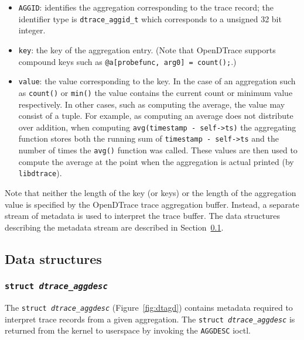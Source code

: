 \begin{itemize}

	\item{\texttt{AGGID}}: identifies the aggregation corresponding to the
trace record; the identifier type is \texttt{dtrace\_aggid\_t} which corresponds
to a unsigned 32 bit integer.

	\item{\texttt{key}:} the key of the aggregation entry. (Note that
OpenDTrace supports compound keys such as \texttt{@a[probefunc, arg0] = count();}.)

	\item{\texttt{value}:} the value corresponding to the key. In the case of
an aggregation such as \texttt{count()} or \texttt{min()} the value contains
the current count or minimum value respectively. In other cases, such as
computing the average, the value may consist of a tuple. For example, as
computing an average does not distribute over addition, when computing
\texttt{avg(timestamp - self->ts)} the aggregating function stores both the
running sum of \texttt{timestamp - self->ts} and the number of times the
\texttt{avg()} function was called. These values are then used to compute the
average at the point when the aggregation is actual printed (by \texttt{libdtrace}).

\end{itemize}

Note that neither the length of the key (or keys) or the length of the aggregation 
value is specified by the OpenDTrace trace aggregation buffer.
Instead, a separate stream of metadata is used to interpret the trace buffer.
The data structures describing the metadata stream are described in
Section~\ref{subsec:agg_data_structures}.

\subsection{Data structures}
\label{subsec:agg_data_structures}

\subsubsection{\texttt{struct~\textit{dtrace\_aggdesc}}}
\label{subsubsec:dtagd}

The \texttt{struct~\textit{dtrace\_aggdesc}} (Figure~\ref{fig:dtagd}) contains
metadata required to interpret trace records from a given aggregation.  The
\texttt{struct~\textit{dtrace\_aggdesc}} is returned from the kernel to userspace
by invoking the \texttt{AGGDESC} ioctl.

